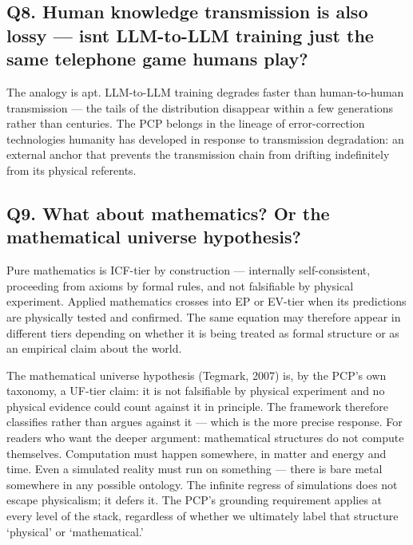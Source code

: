 \documentclass[
]{article}
\begin{document}
\subsection{Q8. Human knowledge transmission is also lossy ---
isn\textquotesingle t LLM-to-LLM training just the same telephone game
humans
play?}\label{q8.-human-knowledge-transmission-is-also-lossy-isnt-llm-to-llm-training-just-the-same-telephone-game-humans-play}

The analogy is apt. LLM-to-LLM training degrades faster than
human-to-human transmission --- the tails of the distribution disappear
within a few generations rather than centuries. The PCP belongs in the
lineage of error-correction technologies humanity has developed in
response to transmission degradation: an external anchor that prevents
the transmission chain from drifting indefinitely from its physical
referents.

\subsection{Q9. What about mathematics? Or the mathematical universe
hypothesis?}\label{q9.-what-about-mathematics-or-the-mathematical-universe-hypothesis}

Pure mathematics is ICF-tier by construction --- internally
self-consistent, proceeding from axioms by formal rules, and not
falsifiable by physical experiment. Applied mathematics crosses into EP
or EV-tier when its predictions are physically tested and confirmed. The
same equation may therefore appear in different tiers depending on
whether it is being treated as formal structure or as an empirical claim
about the world.

The mathematical universe hypothesis (Tegmark, 2007) is, by the PCP's
own taxonomy, a UF-tier claim: it is not falsifiable by physical
experiment and no physical evidence could count against it in principle.
The framework therefore classifies rather than argues against it ---
which is the more precise response. For readers who want the deeper
argument: mathematical structures do not compute themselves. Computation
must happen somewhere, in matter and energy and time. Even a simulated
reality must run on something --- there is bare metal somewhere in any
possible ontology. The infinite regress of simulations does not escape
physicalism; it defers it. The PCP's grounding requirement applies at
every level of the stack, regardless of whether we ultimately label that
structure `physical' or `mathematical.'
\end{document}
